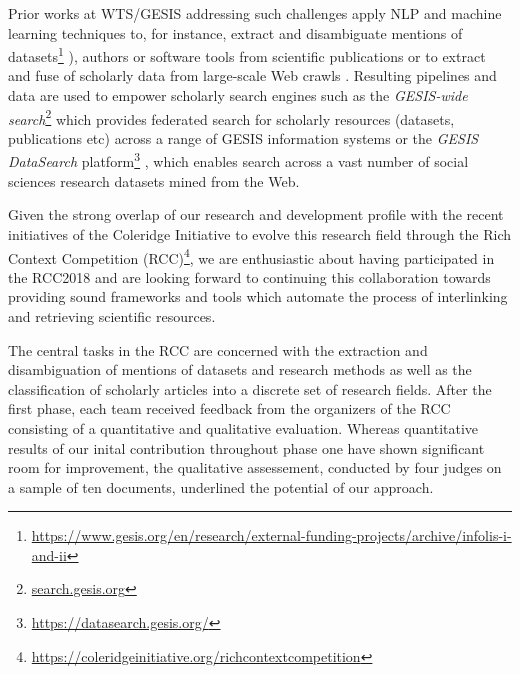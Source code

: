 Prior works at WTS/GESIS addressing such challenges apply NLP and machine learning techniques to, for instance, extract and disambiguate mentions of datasets\footnote{\url{https://www.gesis.org/en/research/external-funding-projects/archive/infolis-i-and-ii}} \cite{boland2012identifying,ghavimi2016semi}), authors \cite{conf/cikm/Backes18, conf/jcdl/Backes18} or software tools \cite{boland2019distant} from scientific publications or to extract and fuse of scholarly data from large-scale Web crawls \cite{journals/semweb/YuGFLRD19, sahoo2015analysing}. Resulting pipelines and data are used to empower scholarly search engines such as the \textit{GESIS-wide search}\footnote{\url{search.gesis.org}}  \cite{conf/jcdl/HienertKBZM19} which provides federated search for scholarly resources (datasets, publications etc) across a range of GESIS information systems or the \textit{GESIS DataSearch} platform\footnote{\url{https://datasearch.gesis.org/}} \cite{Krmer2018ADD}, which enables search across a vast number of social sciences research datasets mined from the Web. 

Given the strong overlap of our research and development profile with the recent initiatives of the Coleridge Initiative to evolve this research field through the Rich Context Competition (RCC)\footnote{\url{https://coleridgeinitiative.org/richcontextcompetition}}, we are enthusiastic about having participated in the RCC2018 and are looking forward to continuing this collaboration towards providing sound frameworks and tools which automate the process of interlinking and retrieving scientific resources.

The central tasks in the RCC are concerned with the extraction and disambiguation of mentions of datasets and research methods as well as the classification of scholarly articles into a discrete set of research fields. After the first phase, each team received feedback from the organizers of the RCC consisting of a quantitative and qualitative evaluation. Whereas quantitative results of our inital contribution throughout phase one have shown significant room for improvement, the qualitative assessement, conducted by four judges on a sample of ten documents, underlined the potential of our approach. 


